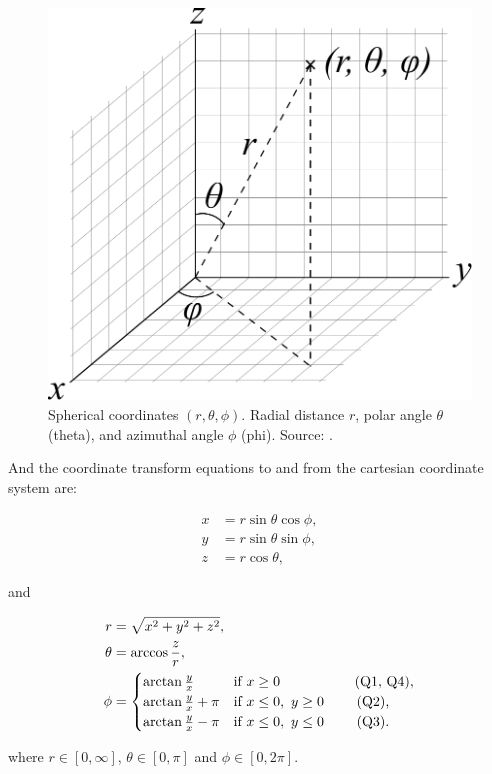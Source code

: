 \begin{figure}[ht]
    \centering
    \includegraphics[width=0.50\linewidth]{fig/3D_Spherical}
    \caption{Spherical coordinates \((r, \theta, \phi)\). Radial distance \(r\), polar angle \(\theta\) (theta), and azimuthal angle \(\phi\) (phi). Source: \cite{WikiSpherical}.}
    \label{fig:3D_Spherical}
\end{figure}

And the coordinate transform equations to and from the cartesian coordinate system are:

\begin{align}
    x &= r \sin{\theta}\cos{\phi}, \label{eq:x(r,theta,phi)} \\
    y &= r \sin{\theta}\sin{\phi}, \label{eq:y(r,theta,phi)}\\
    z &= r \cos{\theta}, \label{eq:z(r,theta,phi)}
\end{align}

and

\begin{align}
    r &= \sqrt{x^2 + y^2 + z^2}, \label{eq:r(x,y,z)}\\
    \theta &= \arccos{\frac{z}{r}}, \label{eq:theta(x,y,z)}\\
    \phi &= 
    \begin{cases}
    \arctan{\frac{y}{x}} & \text{if \(x \geq 0\) \qquad \qquad \ \ \ (Q1, Q4),}
    \\
    \arctan{\frac{y}{x}}+\pi & \text{if \(x \leq 0,\ y \geq 0\) \qquad (Q2),}
    \\
    \arctan{\frac{y}{x}}-\pi & \text{if \(x \leq 0,\ y \leq 0\) \qquad (Q3).}
    \end{cases} \label{eq:phi(x,y,z)}
\end{align}

where \(r \in [0, \infty]\), \(\theta \in [0, \pi]\) and \(\phi \in [0, 2\pi]\).

